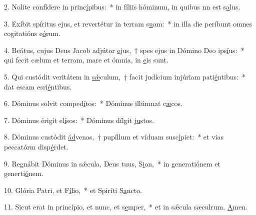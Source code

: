 2. Nolíte confídere in princ\uline{í}pibus:~* in fíliis hóminum, in quibus nn est s\uline{a}lus.\par 
3. Exíbit spíritus ejus, et revertétur in terram s\uline{u}am:~* in illa die períbunt omnes cogitatións e\uline{ó}rum.\par 
4. Beátus, cujus Deus Jacob adjútor \uline{e}jus,~† spes ejus in Dómino Deo ips\uline{í}us:~* qui fecit cælum et terram, mare et ómnia,  in \uline{e}is sunt.\par 
5. Qui custódit veritátem in \uline{sǽ}culum,~† facit judícium injúriam pati\uline{é}ntibus:~* dat escam esri\uline{é}ntibus.\par 
6. Dóminus solvit comped\uline{í}tos:~* Dóminus illúmnat c\uline{æ}cos.\par 
7. Dóminus érigit el\uline{í}sos:~* Dóminus dílgit j\uline{u}stos.\par 
8. Dóminus custódit \uline{ád}venas,~† pupíllum et víduam susc\uline{í}piet:~* et vias peccatórm disp\uline{é}rdet.\par 
9. Regnábit Dóminus in sǽcula, Deus tuus, S\uline{i}on,~* in generatiónem et generti\uline{ó}nem.\par 
10. Glória Patri, et F\uline{í}lio,~* et Spiríti S\uline{a}ncto.\par 
11. Sicut erat in princípio, et nunc, et s\uline{e}mper,~* et in sǽcula sæculrum. \uline{A}men.\par 
